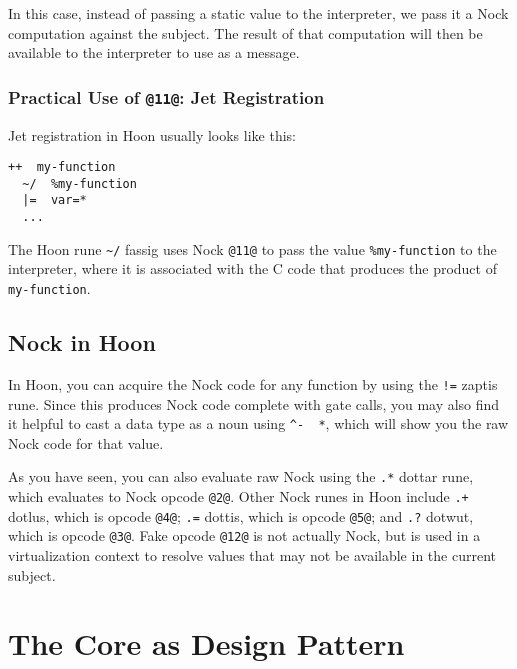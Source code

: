 \documentclass[twoside]{article}
\begin{document}
In this case, instead of passing a static value to the interpreter, we pass it a Nock computation against the subject. The result of that computation will then be available to the interpreter to use as a message.

\subsubsection{Practical Use of \lstinline[style=inlinecode]{@11@}: Jet Registration}

Jet registration in Hoon usually looks like this:

\begin{lstlisting}[style=listingcode]
++  my-function
  ~/  %my-function
  |=  var=*
  ...
\end{lstlisting}

\noindent \sloppy
The Hoon rune \lstinline[style=inlinecode]{~/} fassig uses Nock \lstinline[style=inlinecode]{@11@} to pass the value \lstinline[style=inlinecode]{%my-function} to the interpreter, where it is associated with the C code that produces the product of \lstinline[style=inlinecode]{my-function}.

\subsection{Nock in Hoon}

In Hoon, you can acquire the Nock code for any function by using the \lstinline[style=inlinecode]{!=} zaptis rune.  Since this produces Nock code complete with gate calls, you may also find it helpful to cast a data type as a noun using \lstinline[style=inlinecode]{^-  *}, which will show you the raw Nock code for that value.

As you have seen, you can also evaluate raw Nock using the \lstinline[style=inlinecode]{.*} dottar rune, which evaluates to Nock opcode \lstinline[style=inlinecode]{@2@}.  Other Nock runes in Hoon include \lstinline[style=inlinecode]{.+} dotlus, which is opcode \lstinline[style=inlinecode]{@4@}; \lstinline[style=inlinecode]{.=} dottis, which is opcode \lstinline[style=inlinecode]{@5@}; and \lstinline[style=inlinecode]{.?} dotwut, which is opcode \lstinline[style=inlinecode]{@3@}.  Fake opcode \lstinline[style=inlinecode]{@12@} is not actually Nock, but is used in a virtualization context to resolve values that may not be available in the current subject.

\section{The Core as Design Pattern}
\end{document}
